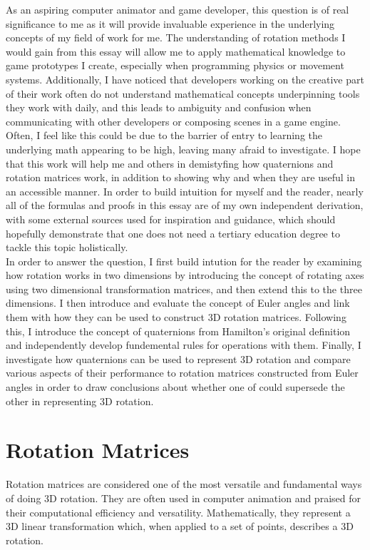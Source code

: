 \documentclass[12pt, a4paper]{article}
\begin{document}
As an aspiring computer animator and game developer, this question is of real
significance to me as it will provide invaluable experience in the underlying
concepts of my field of work for me. The understanding of rotation methods I
would gain from this essay will allow me to apply mathematical knowledge to game
prototypes I create, especially when programming physics or movement systems.
Additionally, I have noticed that developers working on the creative part of
their work often do not understand mathematical concepts underpinning tools they
work with daily, and this leads to ambiguity and confusion when communicating
with other developers or composing scenes in a game engine. Often, I feel like
this could be due to the barrier of entry to learning the underlying math
appearing to be high, leaving many afraid to investigate. I hope that this work
will help me and others in demistyfing how quaternions and rotation matrices
work, in addition to showing why and when they are useful in an accessible
manner. In order to build intuition for myself and the reader, nearly all of the
formulas and proofs in this essay are of my own independent derivation, with
some external sources used for inspiration and guidance, which should hopefully
demonstrate that one does not need a tertiary education degree to tackle this
topic holistically. \\

In order to answer the question, I first build intution for the reader by
examining how rotation works in two dimensions by introducing the concept of
rotating axes using two dimensional transformation matrices, and then extend
this to the three dimensions. I then introduce and evaluate the concept of Euler
angles and link them with how they can be used to construct 3D rotation
matrices. Following this, I introduce the concept of quaternions from Hamilton's
original definition and independently develop fundemental rules for operations
with them. Finally, I investigate how quaternions can be used to represent 3D
rotation and compare various aspects of their performance to rotation matrices
constructed from Euler angles in order to draw conclusions about whether one of
could supersede the other in representing 3D rotation.

\pagebreak

\section{Rotation Matrices}
Rotation matrices are considered one of the most versatile and fundamental ways
of doing 3D rotation. They are often used in computer animation and praised for
their computational efficiency and versatility. Mathematically, they represent a
3D linear transformation which, when applied to a set of points, describes a 3D
rotation.
\end{document}
